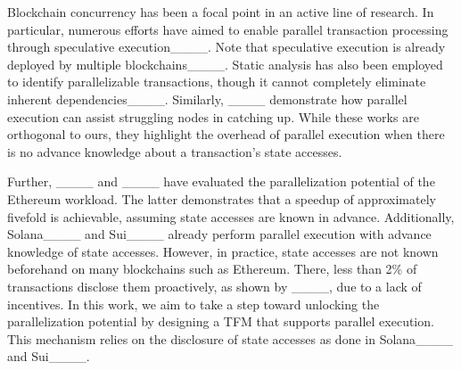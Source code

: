 Blockchain concurrency has been a focal point in an active line of research. In particular, numerous efforts have aimed to enable parallel transaction processing through speculative execution____. Note that speculative execution is already deployed by multiple blockchains____. Static analysis has also been employed to identify parallelizable transactions, though it cannot completely eliminate inherent dependencies____. Similarly, ____ demonstrate how parallel execution can assist struggling nodes in catching up. While these works are orthogonal to ours, they highlight the overhead of parallel execution when there is no advance knowledge about a transaction's state accesses.

Further, ____ and ____ have evaluated the parallelization potential of the Ethereum workload. The latter demonstrates that a speedup of approximately fivefold is achievable, assuming state accesses are known in advance. Additionally, Solana____ and Sui____ already perform parallel execution with advance knowledge of state accesses. However, in practice, state accesses are not known beforehand on many blockchains such as Ethereum. There, less than 2\% of transactions disclose them proactively, as shown by ____, due to a lack of incentives. In this work, we aim to take a step toward unlocking the parallelization potential by designing a TFM that supports parallel execution. This mechanism relies on the disclosure of state accesses as done in Solana____ and Sui____.
